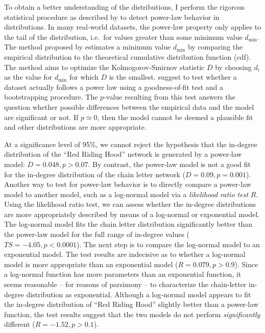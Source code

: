 To obtain a better understanding of the distributions, I perform the rigorous statistical procedure as described by \citeauthor{clauset:2009} to detect power-law behavior in distributions\autocite{clauset:2009}. In many real-world datasets, the power-law property only applies to the tail of the distribution, i.e.\ for values greater than some minimum value $d_{\text{min}}$. The method proposed by \citeauthor{clauset:2009} estimates a minimum value $d_{\text{min}}$ by comparing the empirical distribution to the theoretical cumulative distribution function (cdf). The method aims to optimize the Kolmogorov-Smirnov statistic $D$ by choosing $d_i$ as the value for $d_{\text{min}}$ for which $D$ is the smallest. \citeauthor{clauset:2009} suggest to test whether a dataset actually follows a power law using a goodness-of-fit test and a bootstrapping procedure\autocite{clauset:2009}. The $p$-value resulting from this test answers the question whether possible differences between the empirical data and the model are significant or not. If $p \simeq 0$, then the model cannot be deemed a plausible fit and other distributions are more appropriate. 

At a significance level of 95\%, we cannot reject the hypothesis that the in-degree distribution of the ``Red Riding Hood'' network is generated by a power-law model: $D=0.048, p > 0.07$. By contrast, the power-law model is not a good fit for the in-degree distribution of the chain letter network ($D=0.09, p = 0.001$). Another way to test for power-law behavior is to directly compare a power-law model to another model, such as a log-normal model via a \emph{likelihood ratio test} $R$\autocite{clauset:2009}. Using the likelihood ratio test, we can assess whether the in-degree distributions are more appropriately described by means of a log-normal or exponential model. The log-normal model fits the chain letter distribution significantly better than the power-law model for the full range of in-degree values ($TS=-4.05, p < 0.0001$). The next step is to compare the log-normal model to an exponential model. The test results are indecisive as to whether a log-normal model is more appropriate than an exponential model ($R=0.079, p > 0.9$). Since a log-normal function has more parameters than an exponential function, it seems reasonable -- for reasons of parsimony -- to characterize the chain-letter in-degree distribution as exponential. Although a log-normal model appears to fit the in-degree distribution of ``Red Riding Hood'' slightly better than a power-law function, the test results suggest that the two models do not perform \emph{significantly} different ($R=-1.52, p > 0.1$).

